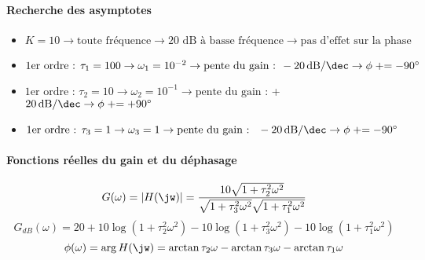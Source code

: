 \paragraph{Recherche des asymptotes}
\begin{itemize}
\item $K=10                                    \rightarrow 
      \textrm{toute fréquence}                 \rightarrow 
      \textrm{20 dB à basse fréquence}         \rightarrow 
      \textrm{pas d'effet sur la phase}$
\item $\textrm{1er ordre : }\tau_1=100         \rightarrow 
      \omega_1=10^{-2}                         \rightarrow 
      \textrm{pente du gain : } 
      \SI[per-mode=symbol]{-20}{\dB\per\dec}   \rightarrow 
      \phi\mathrel{+}=-90\si{\degree}$ 
\item $\textrm{1er ordre : }\tau_2=10          \rightarrow 
      \omega_2=10^{-1}                         \rightarrow 
      \textrm{pente du gain : } 
      $+$\SI[per-mode=symbol]{20}{\dB\per\dec} \rightarrow 
      \phi\mathrel{+}=+90\si{\degree}$ 
\item $\textrm{1er ordre : }\tau_3=1           \rightarrow 
      \omega_3=1                               \rightarrow 
      \textrm{pente du gain : } 
      \SI[per-mode=symbol]{-20}{\dB\per\dec}   \rightarrow 
      \phi\mathrel{+}=-90\si{\degree}$ 
\end{itemize}
\begin{center}
    
    
    
\end{center}
\paragraph{Fonctions réelles du gain et du déphasage}
\[
G(\omega)
=|H(\jw)|=\dfrac{10\sqrt{1+\tau_2^2\omega^2}}
                {\sqrt{1+\tau_3^2\omega^2}\sqrt{1+\tau_1^2\omega^2}}
\]
\[
G_{dB}(\omega)=20+10\log{(1+\tau_2^2\omega^2)}
                 -10\log{(1+\tau_3^2\omega^2)}
                 -10\log{(1+\tau_1^2\omega^2)}
\]
\[
\phi(\omega)=\arg{H(\jw)}=\arctan{\tau_2\omega}
                         -\arctan{\tau_3\omega}
                         -\arctan{\tau_1\omega}
\]
